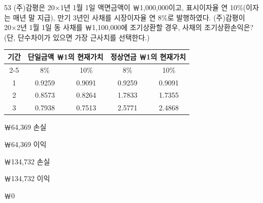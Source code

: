 \begin{question}{53}
(주)감평은 20×1년 1월 1일 액면금액이 ￦1,000,000이고, 표시이자율 연 10\%(이자는 매년 말 지급), 만기 3년인 사채를 시장이자율 연 8\%로 발행하였다. (주)감평이 20×2년 1월 1일 동 사채를 ￦1,100,000에 조기상환할 경우, 사채의 조기상환손익은? (단, 단수차이가 있으면 가장 근사치를 선택한다.)

{\small\centering
\begin{tabular}{|c|c|c|c|c|}\hline
\multirow{2}{*}{기간} & \multicolumn{2}{c|}{단일금액 ￦1의 현재가치} & \multicolumn{2}{c|}{정상연금 ￦1의 현재가치} \\ \cline{2-5}
 & 8\% & 10\% & 8\% & 10\% \\ \hline
1 & 0.9259 & 0.9091 & 0.9259 & 0.9091 \\ \hline
2 & 0.8573 & 0.8264 & 1.7833 & 1.7355 \\ \hline
3 & 0.7938 & 0.7513 & 2.5771 & 2.4868 \\ \hline
\end{tabular}\par}
\begin{choices}
  \item ￦64,369 손실
  \item ￦64,369 이익
  \item ￦134,732 손실
  \item ￦134,732 이익
  \item ￦0
\end{choices}
\end{question}
